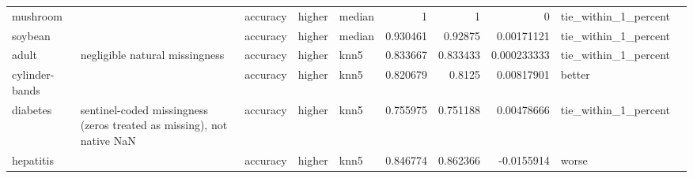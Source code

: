 \begin{table}[ht]
{\begin{tabular}{lllllrrrll}
 mushroom       &                                                                       & accuracy                       & higher             & median           &                   1        &               1        &                     0           & tie\_within\_1\_percent &                                                                                                                    \\
 soybean        &                                                                       & accuracy                       & higher             & median           &                   0.930461 &               0.92875  &                     0.00171121  & tie\_within\_1\_percent &                                                                                                                    \\
 adult          & negligible natural missingness                                        & accuracy                       & higher             & knn5             &                   0.833667 &               0.833433 &                     0.000233333 & tie\_within\_1\_percent &                                                                                                                    \\
 cylinder-bands &                                                                       & accuracy                       & higher             & knn5             &                   0.820679 &               0.8125   &                     0.00817901  & better               &                                                                                                                    \\
 diabetes       & sentinel-coded missingness (zeros treated as missing), not native NaN & accuracy                       & higher             & knn5             &                   0.755975 &               0.751188 &                     0.00478666  & tie\_within\_1\_percent &                                                                                                                    \\
 hepatitis      &                                                                       & accuracy                       & higher             & knn5             &                   0.846774 &               0.862366 &                    -0.0155914   & worse                &                                                                                                                    \\

\end{tabular}}
\end{table}
